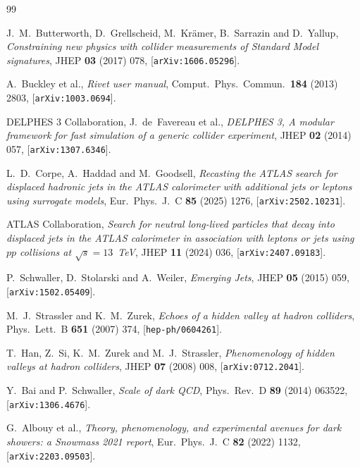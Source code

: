 \documentclass[a4paper,11pt]{article}
\begin{document}
\begin{thebibliography}{99}

J.~M.~Butterworth, D.~Grellscheid, M.~Kr\"amer, B.~Sarrazin and D.~Yallup,
\emph{Constraining new physics with collider measurements of Standard
Model signatures},
JHEP \textbf{03} (2017) 078, [\texttt{arXiv:1606.05296}].

A.~Buckley et al.,
\emph{Rivet user manual},
Comput.\ Phys.\ Commun.\ \textbf{184} (2013) 2803,
[\texttt{arXiv:1003.0694}].

DELPHES 3 Collaboration, J.~de~Favereau et al.,
\emph{DELPHES 3, A modular framework for fast simulation of a generic
collider experiment},
JHEP \textbf{02} (2014) 057, [\texttt{arXiv:1307.6346}].

L.~D.~Corpe, A.~Haddad and M.~Goodsell,
\emph{Recasting the ATLAS search for displaced hadronic jets in the
ATLAS calorimeter with additional jets or leptons using surrogate
models},
Eur.\ Phys.\ J.\ C \textbf{85} (2025) 1276, [\texttt{arXiv:2502.10231}].

ATLAS Collaboration,
\emph{Search for neutral long-lived particles that decay into displaced
jets in the ATLAS calorimeter in association with leptons or jets using
$pp$ collisions at $\sqrt{s} = 13$~TeV},
JHEP \textbf{11} (2024) 036, [\texttt{arXiv:2407.09183}].

P.~Schwaller, D.~Stolarski and A.~Weiler,
\emph{Emerging Jets},
JHEP \textbf{05} (2015) 059, [\texttt{arXiv:1502.05409}].

M.~J.~Strassler and K.~M.~Zurek,
\emph{Echoes of a hidden valley at hadron colliders},
Phys.\ Lett.\ B \textbf{651} (2007) 374, [\texttt{hep-ph/0604261}].

T.~Han, Z.~Si, K.~M.~Zurek and M.~J.~Strassler,
\emph{Phenomenology of hidden valleys at hadron colliders},
JHEP \textbf{07} (2008) 008, [\texttt{arXiv:0712.2041}].

Y.~Bai and P.~Schwaller,
\emph{Scale of dark QCD},
Phys.\ Rev.\ D \textbf{89} (2014) 063522, [\texttt{arXiv:1306.4676}].

G.~Albouy et al.,
\emph{Theory, phenomenology, and experimental avenues for dark showers:
a Snowmass 2021 report},
Eur.\ Phys.\ J.\ C \textbf{82} (2022) 1132, [\texttt{arXiv:2203.09503}].


\end{thebibliography}
\end{document}
